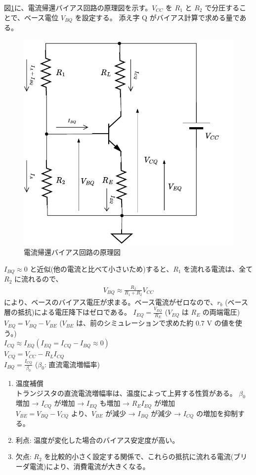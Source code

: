 図\ref{current_bias}に、電流帰還バイアス回路の原理図を示す。$V_{CC}$ を $R_1$ と $R_2$ で分圧することで、ベース電位 $V_{BQ}$ を設定する。
添え字 Q がバイアス計算で求める量である。
\begin{figure}[htbp]
  \begin{center}
  \includegraphics[width=0.45\linewidth]{img/43.pdf}
  \caption{電流帰還バイアス回路の原理図}
  \label{current_bias}
  \end{center}
\end{figure}


$I_{BQ} \approx 0$ と近似(他の電流と比べて小さいため)すると、$R_1$ を流れる電流は、全て$R_{2}$ に流れるので、\\
\begin{align}
  V_{BQ} \approx \frac{R_2}{R_1+R_2}V_{CC}
\end{align}
により、ベースのバイアス電圧が求まる。ベース電流がゼロなので、$r_b$ (ベース層の抵抗)による電圧降下はゼロである。
$I_{EQ} = \frac{V_{EQ}}{R_E}$ ($V_{EQ}$ は $R_E$ の両端電圧)\\
$V_{EQ} = V_{BQ} - V_{BE}$ ($V_{BE}$ は、前のシミュレーションで求めた約 0.7 V の値を使う。)\\
$I_{CQ} \approx I_{EQ} (I_{EQ} = I_{CQ} - I_{BQ} \approx 0)$\\
$V_{CQ} = V_{CC} - R_LI_{CQ}$\\
$I_{BQ} = \frac{I_{CQ}}{\beta_0}$ ($\beta_0$: 直流電流増幅率)

\begin{enumerate}
  \setlength{\parskip}{0cm} %
  \setlength{\itemsep}{0cm} %
  \item 温度補償\\
  トランジスタの直流電流増幅率は、温度によって上昇する性質がある。
  $\beta_{0}$ 増加 → $I_{CQ}$ が増加 → $I_{EQ}$ も増加 → $R_{E}I_{EQ}$ が増加\\
  $V_{BE} = V_{BQ} - V_{CQ}$ より、$V_{BE}$ が減少 → $I_{BQ}$ が減少 → $I_{CQ}$ の増加を抑制する。
  \item 利点: 温度が変化した場合のバイアス安定度が高い。
  \item 欠点: $R_2$ を比較的小さく設定する関係で、これらの抵抗に流れる電流(ブリーダ電流)により、消費電流が大きくなる。
\end{enumerate}


